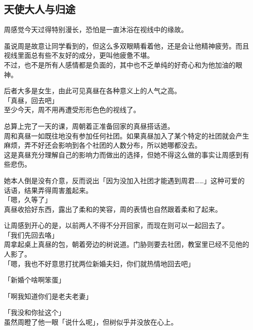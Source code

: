 \subsection{天使大人与归途}

周感觉今天过得特别漫长，恐怕是一直沐浴在视线中的缘故。

虽说周是故意让同学看到的，但这么多双眼睛看着他，还是会让他精神疲劳。而且视线里面总有些不友好的成分，更叫他疲惫不堪。\\

不过，也不是所有人感情都是负面的，其中也不乏单纯的好奇心和为他加油的眼神。

后者大多是女生，由此可见真昼在各种意义上的人气之高。\\

「真昼，回去吧」\\

至少今天，周不用再遭受形形色色的视线了。

总算上完了一天的课，周朝着正准备回家的真昼搭话道。\\

周和真昼一如既往地没有参加任何社团。如果真昼加入了某个特定的社团就会产生麻烦，弄不好还会影响到各个社团的人数分布，所以她哪都没去。\\

这是真昼充分理解自己的影响力而做出的选择，但她不得这么做的事实让周感到有些悲伤。

她本人倒是没有介意，反而说出「因为没加入社团才能遇到周君……」这种可爱的话语，结果弄得周害羞起来。\\

「嗯，久等了」\\

真昼收拾好东西，露出了柔和的笑容，周的表情也自然跟着柔和了起来。

让周感到开心的是，以前两人不得不分开回家，而现在则可以一起回去了。\\

「我们先回去咯」\\

周拿起桌上真昼的包，朝着旁边的树说道。门胁则要去社团，教室里已经不见他的人影了。\\

「嗯，我也不好意思打扰两位新婚夫妇，你们就热情地回去吧」

「新婚个啥啊笨蛋」

「啊我知道你们是老夫老妻」

「我没和你扯这个」\\

虽然周瞪了他一眼「说什么呢」，但树似乎并没放在心上。

